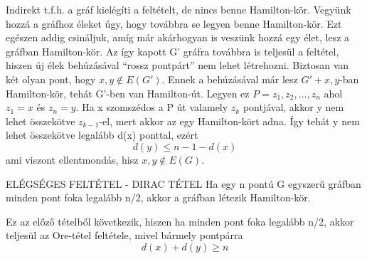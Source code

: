 \begin{bizonyitas}{}
Indirekt t.f.h. a gráf kielégíti a feltételt, de nincs benne Hamilton-kör. Vegyünk hozzá a gráfhoz éleket úgy, hogy továbbra se legyen benne Hamilton-kör. Ezt egészen addig csináljuk, amíg már akárhogyan is veszünk hozzá egy élet, lesz a gráfban Hamilton-kör. Az így kapott G' gráfra továbbra is teljesül a feltétel, hiszen új élek behúzásával ``rossz pontpárt'' nem lehet létrehozni. Biztosan van két olyan pont, hogy ${x,y} \not \in E(G')$. Ennek a behúzásával már lesz $G' + {x,y}$-ban Hamilton-kör, tehát G'-ben van Hamilton-út. Legyen ez $P = {z_1, z_2,...,z_n}$ ahol $z_1 = x$ és $z_n = y$.
Ha x szomszédos a P út valamely $z_k$ pontjával, akkor y nem lehet összekötve $z_{k-1}$-el, mert akkor az egy Hamilton-kört adna. Így tehát y nem lehet összekötve legalább d(x) ponttal, ezért
$$d(y) \leq n - 1 - d(x)$$
ami viszont ellentmondás, hisz ${x,y} \not\in E(G)$.
\end{bizonyitas}

\begin{tetel}{ELÉGSÉGES FELTÉTEL - DIRAC TÉTEL}
Ha egy n pontú G egyszerű gráfban minden pont foka legalább n/2, akkor a gráfban létezik Hamilton-kör.
\end{tetel}

\begin{bizonyitas}{}
Ez az előző tételből következik, hiszen ha minden pont foka legalább n/2, akkor teljesül az Ore-tétel feltétele, mivel bármely pontpárra $$d(x) + d(y) \geq n$$
\end{bizonyitas}
